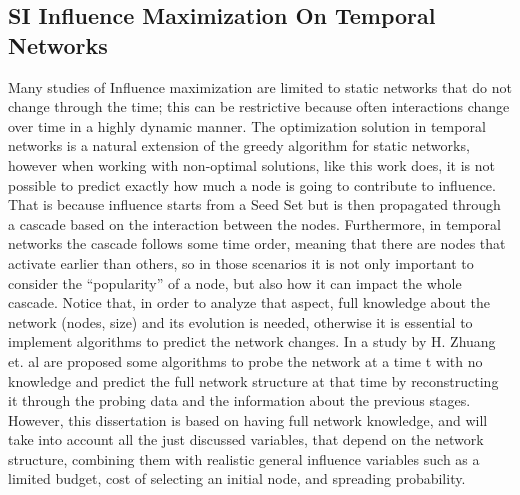 \subsection{SI Influence Maximization On Temporal Networks}
\label{sec:dynamic}
Many studies of Influence maximization are limited to static networks that do not change through the time; this can be restrictive because often interactions change over time in a highly dynamic manner. The optimization solution in temporal networks is a natural extension of the greedy algorithm for static networks\cite{unknown}, however when working with non-optimal solutions, like this work does, it is not possible to predict exactly how much a node is going to contribute to influence. That is because influence starts from a Seed Set but is then propagated through a cascade based on the interaction between the nodes. Furthermore, in temporal networks the cascade follows some time order, meaning that there are nodes that activate earlier than others, so in those scenarios it is not only important to consider the “popularity” of a node, but also how it can impact the whole cascade. Notice that, in order to analyze that aspect, full knowledge about the network (nodes, size) and its evolution is needed, otherwise it is essential to implement algorithms to predict the network changes. In a study by H. Zhuang et. al \cite{inproceedings} are proposed some algorithms to probe the network at a time t with no knowledge and predict the full network structure at that time by reconstructing it through the probing data and the information about the previous stages. However, this dissertation is based on having full network knowledge, and will take into account all the just discussed variables, that depend on the network structure, combining them with realistic general influence variables such as a limited budget, cost of selecting an initial node, and spreading probability.

